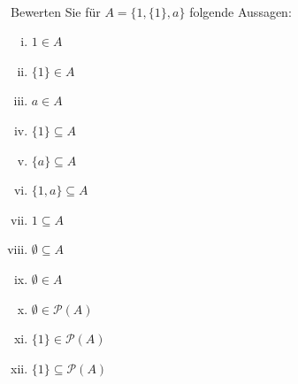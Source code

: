 \newcommand{\printpraesenzlsg}{false}
\newcommand{\printloesungen}{true}
\newcommand{\printbewertungen}{false}
\newcommand{\blattnummer}{1}



\iforiginal{}

	

\\
Bewerten Sie für $A=\{1,\{1\},a\}$ folgende Aussagen:
\begin{enumerate}[(i)]
  \item $1\in A$
  \item $\{1\}\in A$
  \item $a\in A$
  \item $\{1\}\subseteq A$
  \item $\{a\}\subseteq A$
  \item $\{1,a\}\subseteq A$
  \item $1\subseteq A$
  \item $\emptyset\subseteq A$
  \item $\emptyset\in A$
  \item $\emptyset\in\mathcal{P}(A)$
  \item $\{1\}\in\mathcal{P}(A)$
  \item $\{1\}\subseteq\mathcal{P}(A)$
\end{enumerate}

